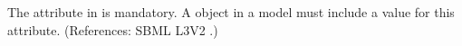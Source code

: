 The attribute  in \Species is mandatory.  A \Species
object in a model must include a value for this attribute.  (References:
SBML L3V2 .)
